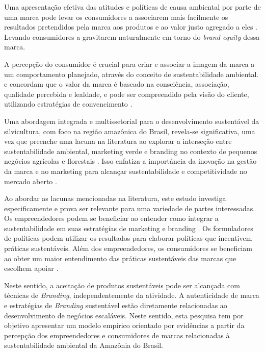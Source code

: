 Uma apresentação efetiva das atitudes e políticas de causa ambiental por parte de uma marca pode levar os consumidores a associarem mais facilmente os resultados pretendidos pela marca aos produtos e ao valor justo agregado a eles \cite{Wang2020f,Guzman2017TheFit}. Levando consumidores a gravitarem naturalmente em torno do \textit{brand equity} dessa marca. 

A percepção do consumidor é crucial para criar e associar a imagem da marca a um comportamento planejado, através do conceito de sustentabilidade ambiental.  e  concordam que o valor da marca é baseado na consciência, associação, qualidade percebida e lealdade, e pode ser compreendido pela visão do cliente, utilizando estratégias de convencimento \cite{Tasci2018TestingBrands}.


Uma abordagem integrada e multissetorial para o desenvolvimento sustentável da silvicultura, com foco na região amazônica do Brasil, revela-se significativa, uma vez que preenche uma lacuna na literatura ao explorar a interseção entre sustentabilidade ambiental, marketing verde e branding no contexto de pequenos negócios agrícolas e florestais \cite{Chukurna2021MarketingDevelopment}. Isso enfatiza a importância da inovação na gestão da marca e no marketing para alcançar sustentabilidade e competitividade no mercado aberto \cite{Mancuso2021UnderstandingDomain}.

Ao abordar as lacunas mencionadas na literatura, este estudo investiga especificamente e prova ser relevante para uma variedade de partes interessadas. Os empreendedores podem se beneficiar ao entender como integrar a sustentabilidade em suas estratégias de marketing e branding \cite{Oliveira2011Sustentabilidade:Organizacoes}. Os formuladores de políticas podem utilizar os resultados para elaborar políticas que incentivem práticas sustentáveis. Além dos empreendedores, os consumidores se beneficiam ao obter um maior entendimento das práticas sustentáveis das marcas que escolhem apoiar \cite{Minton2012SustainableMedia}.

Neste sentido, a aceitação de produtos sustentáveis pode ser alcançada com técnicas de \textit{Branding}, independentemente da atividade. A autenticidade de marca e estratégias de \textit{Branding} sustentável estão diretamente relacionadas ao desenvolvimento de negócios escaláveis. Neste sentido, esta pesquisa tem por objetivo apresentar um modelo empírico orientado por evidências a partir da percepção dos empreendedores e consumidores de marcas relacionadas à sustentabilidade ambiental da Amazônia do Brasil.

